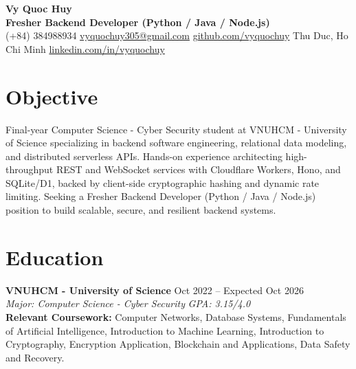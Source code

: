 \documentclass[10pt,a4paper]{article}
\begin{document}
\pagestyle{empty}

\begin{center}
    {\huge \textbf{Vy Quoc Huy}} \\ \vspace{4pt}
    {\Large \textbf{Fresher Backend Developer (Python / Java / Node.js)}} \\ \vspace{4pt}
    (+84) 384988934 \quad \href{mailto:vyquochuy305@gmail.com}{vyquochuy305@gmail.com} \quad \href{https://github.com/vyquochuy}{github.com/vyquochuy} \quad Thu Duc, Ho Chi Minh \quad \href{https://www.linkedin.com/in/vyquochuy/}{linkedin.com/in/vyquochuy}
\end{center}

\section*{Objective}
Final-year Computer Science - Cyber Security student at VNUHCM - University of Science specializing in backend software engineering, relational data modeling, and distributed serverless APIs. Hands-on experience architecting high-throughput REST and WebSocket services with Cloudflare Workers, Hono, and SQLite/D1, backed by client-side cryptographic hashing and dynamic rate limiting. Seeking a Fresher Backend Developer (Python / Java / Node.js) position to build scalable, secure, and resilient backend systems.

\section*{Education}
\noindent \textbf{VNUHCM - University of Science} \hfill Oct 2022 -- Expected Oct 2026\\
\textit{Major: Computer Science - Cyber Security} \hfill \textit{GPA: 3.15/4.0}\\
\textbf{Relevant Coursework:} Computer Networks, Database Systems, Fundamentals of Artificial Intelligence, Introduction to Machine Learning, Introduction to Cryptography, Encryption Application, Blockchain and Applications, Data Safety and Recovery.

\end{document}
